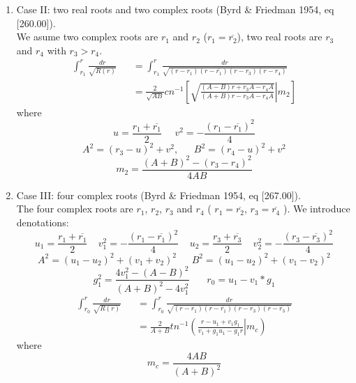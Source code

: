 \documentclass[12pt]{book}
\begin{document}
\begin{enumerate}
\item Case II: two real roots and two complex roots (Byrd \& Friedman 1954, eq [260.00]).\\
We asume two complex roots are $r_1$ and $r_2$ ($r_1=\overline{r_2} $), two real roots are $r_3$ and $r_4$ with $r_3>r_4$.
\begin{eqnarray}
\int_{r_1}^{r}\frac{dr}{\sqrt{R(r)}}&&=\int_{r_1}^{r}\frac{dr}{\sqrt{(r-r_1)(r-\overline{r_1})(r-r_3)(r-r_4)}}\\
&&=\frac{2}{\sqrt{AB}}cn^{-1}\left[\left.\sqrt{\frac{(A-B)r+r_3A-r_4A}{(A+B)r-r_3A-r_4A}}\right|m_2\right]
\end{eqnarray}
where
\begin{equation}
 u=\frac{r_1+\overline{r_1}}{2}~~~~~~v^2=-\frac{(r_1-\overline{r_1})^2}{4}
\end{equation}
%
\begin{equation}
 A^2=(r_3-u)^2+v^2,~~~~~~~B^2=(r_4-u)^2+v^2
\end{equation}
\begin{equation}
m_2=\frac{(A+B)^2-(r_3-r_4)^2}{4AB}
\end{equation}
\item Case III: four complex roots (Byrd \& Friedman 1954, eq [267.00]).\\
The four complex roots are $r_1$, $r_2$, $r_3$ and $r_4$ ( $r_1=\overline{r_2} $, $r_3=\overline{r_4} $ ). We introduce denotations:
\begin{equation}
u_1=\frac{r_1+\overline{r_1}}{2}~~~~~v_1^2=-\frac{(r_1-\overline{r_1})^2}{4}~~~~~
u_2=\frac{r_3+\overline{r_3}}{2}~~~~~v_2^2=-\frac{(r_3-\overline{r_3})^2}{4}
\end{equation}
\begin{equation}
A^2=(u_1-u_2)^2+(v_1+v_2)^2~~~~~~~B^2=(u_1-u_2)^2+(v_1-v_2)^2
\end{equation}
\begin{equation}
g_1^2=\frac{4v_1^2-(A-B)^2}{(A+B)^2-4v_1^2}~~~~~~~~r_{0}=u_1-v_1*g_1
\end{equation}
%
%
\begin{eqnarray}
\int_{r_0}^{r}\frac{dr}{\sqrt{R(r)}}&&=\int_{r_0}^{r}\frac{dr}{\sqrt{(r-r_1)(r-\overline{r_1})(r-r_3)(r-\overline{r_3})}}\\
&&=\frac{2}{A+B}tn^{-1}\left(\left.\frac{r-u_1+v_1g_1}{v_1+g_1u_1-g_1r}\right|m_c\right)
\end{eqnarray}
where
\begin{equation}
m_c=\frac{4AB}{(A+B)^2}
\end{equation}
\end{enumerate}
\end{document}
